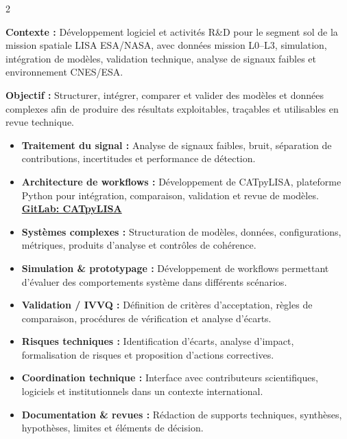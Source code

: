 \documentclass[8pt,a4paper,ragged2e,withhyper]{altacv}
\begin{document}
\begin{paracol}{2}
\divider


\textbf{Contexte :} Développement logiciel et activités R\&D pour le segment sol de la mission spatiale LISA ESA/NASA, avec données mission L0--L3, simulation, intégration de modèles, validation technique, analyse de signaux faibles et environnement CNES/ESA.

\textbf{Objectif :} Structurer, intégrer, comparer et valider des modèles et données complexes afin de produire des résultats exploitables, traçables et utilisables en revue technique.

\begin{itemize}
  \item \textbf{Traitement du signal :} Analyse de signaux faibles, bruit, séparation de contributions, incertitudes et performance de détection.
  \item \textbf{Architecture de workflows :} Développement de CATpyLISA, plateforme Python pour intégration, comparaison, validation et revue de modèles.
  \textcolor{DarkPastelRed}{\href{https://gitlab.oca.eu/gboileau/lisa_l3_tools}{\bf GitLab: CATpyLISA}}
  \item \textbf{Systèmes complexes :} Structuration de modèles, données, configurations, métriques, produits d’analyse et contrôles de cohérence.
  \item \textbf{Simulation \& prototypage :} Développement de workflows permettant d’évaluer des comportements système dans différents scénarios.
  \item \textbf{Validation / IVVQ :} Définition de critères d’acceptation, règles de comparaison, procédures de vérification et analyse d’écarts.
  \item \textbf{Risques techniques :} Identification d’écarts, analyse d’impact, formalisation de risques et proposition d’actions correctives.
  \item \textbf{Coordination technique :} Interface avec contributeurs scientifiques, logiciels et institutionnels dans un contexte international.
  \item \textbf{Documentation \& revues :} Rédaction de supports techniques, synthèses, hypothèses, limites et éléments de décision.
\end{itemize}

\divider



\end{paracol}
\end{document}

